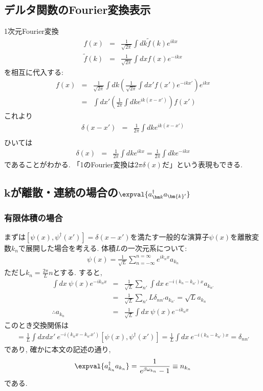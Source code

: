 \subsection{デルタ関数のFourier変換表示}
1次元Fourier変換
\begin{eqnarray}
  f(x) &=& \frac{1}{\sqrt{2\pi}}\int dk \tilde{f}(k)e^{ikx}\\
  \tilde{f}(k) &=& \frac{1}{\sqrt{2\pi}}\int dx f(x)e^{-ikx}
\end{eqnarray}
を相互に代入する:
\begin{eqnarray}
  f(x) &=& \frac{1}{\sqrt{2\pi}}\int dk \left(\frac{1}{\sqrt{2\pi}}\int dx' f(x')e^{-ikx'}\right)e^{ikx}\\
  &=& \int dx' \left(\frac{1}{2\pi}\int dk e^{ik(x-x')}\right)f(x')
\end{eqnarray}
これより
\begin{eqnarray}
  \delta(x-x') &=& \frac{1}{2\pi}\int dk e^{ik(x-x')}\\
\end{eqnarray}
ひいては
\begin{eqnarray}
  \delta(x) &=& \frac{1}{2\pi}\int dk e^{ikx} = \frac{1}{2\pi}\int dk e^{-ikx}
\end{eqnarray}
であることがわかる. 「1のFourier変換は$2\pi\delta(x)$だ」という表現もできる. 
\subsection{$\bm{k}$が離散・連続の場合の$\expval{a_{\bm k}^\dagger a_{\bm{k}'}}$}
\subsubsection{有限体積の場合}
まずは$\left[\psi(x), \psi^\dagger(x')\right] = \delta(x - x')$を満たす一般的な演算子$\psi(x)$を離散変数$k_n$で展開した場合を考える. 体積$L$の一次元系について:
\begin{eqnarray}
  \psi(x) = \frac{1}{\sqrt{L}}\sum_{n=-\infty}^{n=\infty}e^{ik_nx}a_{k_n}
\end{eqnarray}
ただし$k_n = \frac{2\pi}{L}n$とする. すると,
\begin{eqnarray}
  \int dx\ \psi(x)e^{-ik_nx} &=& \frac{1}{\sqrt{L}}\sum_{n'}\int dx\ e^{-i(k_n-k_{n'})x}a_{k_{n'}}\\
  &=& \frac{1}{\sqrt{L}}\sum_{n'}L\delta_{nn'}a_{k_{n'}} = \sqrt{L}a_{k_n}\\
  \therefore a_{k_n} &=& \frac{1}{\sqrt{L}}\int dx\ \psi(x)e^{-ik_nx}  
\end{eqnarray}
このとき交換関係は
\begin{eqnarray}
  [a_{k_n}, a^\dagger_{k_{n'}}] = \frac{1}{L}\int dx dx'\ e^{-i(k_nx - k_{n'}x')}\left[\psi(x), \psi^\dagger(x')\right] = \frac{1}{L}\int dx \ e^{-i(k_n - k_{n'})x} = \delta_{nn'}
\end{eqnarray}
であり, 確かに本文の記述の通り,
\begin{eqnarray}
  \expval{a_{k_n}^\dagger a_{k_n}} = \frac{1}{e^{\beta\omega_{k_n}}-1} \equiv n_{k_n}
\end{eqnarray}
である.
